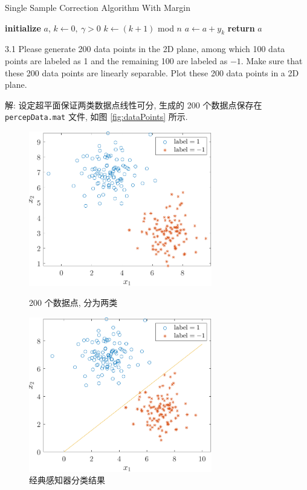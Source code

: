 \documentclass{article}
\begin{document}
\begin{algorithm}[htb]
  \caption{Single Sample Correction Algorithm With Margin}
  \label{alg:2}
  \begin{algorithmic}[1]
  \STATE \textbf{initialize} $a$, $k\gets0,~\gamma>0$
  \REPEAT
    \STATE $k\gets(k+1)$ mod $n$
        \STATE $a\gets a+y_k$
    \ENDIF
  \STATE \textbf{return} $a$
  \end{algorithmic}
\end{algorithm}

3.1 Please generate 200 data points in the 2D plane, among which 100 data points are labeled as 1 and the remaining 100 are labeled as $-1$. Make sure that these 200 data points are linearly separable. Plot these 200 data points in a 2D plane.

解: 设定超平面保证两类数据点线性可分, 生成的 200 个数据点保存在 \verb|percepData.mat| 文件, 如图 \ref{fig:dataPoints} 所示.

\begin{figure}[tbp]
  \centering
  \begin{minipage}[t]{0.48\textwidth}
  \centering
  \includegraphics[width=8cm]{dataPoints.pdf}
  \caption{200 个数据点, 分为两类}
  \label{fig:dataPoints}
  \end{minipage}
  \begin{minipage}[t]{0.48\textwidth}
  \centering
  \includegraphics[width=8cm]{classicalPrecep.pdf}
  \caption{经典感知器分类结果}
  \label{fig:classicalPrecep}
  \end{minipage}
\end{figure}
\end{document}
